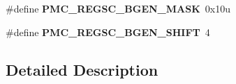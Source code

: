 \begin{DoxyCompactItemize}
\item 
\#define {\bfseries P\+M\+C\+\_\+\+R\+E\+G\+S\+C\+\_\+\+B\+G\+E\+N\+\_\+\+M\+A\+SK}~0x10u\hypertarget{group__PMC__Register__Masks_ga7e1520a56f4d2675018d5efaa9492f19}{}\label{group__PMC__Register__Masks_ga7e1520a56f4d2675018d5efaa9492f19}

\item 
\#define {\bfseries P\+M\+C\+\_\+\+R\+E\+G\+S\+C\+\_\+\+B\+G\+E\+N\+\_\+\+S\+H\+I\+FT}~4\hypertarget{group__PMC__Register__Masks_gab43d258e6864ee3a7a728de1d720f6fe}{}\label{group__PMC__Register__Masks_gab43d258e6864ee3a7a728de1d720f6fe}

\end{DoxyCompactItemize}


\subsection{Detailed Description}
